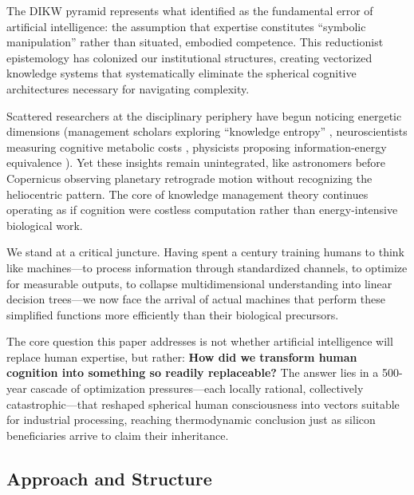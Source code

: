 The DIKW pyramid represents what \citet{dreyfus1979} identified as the fundamental error of artificial intelligence: the assumption that expertise constitutes ``symbolic manipulation'' rather than situated, embodied competence. This reductionist epistemology has colonized our institutional structures, creating vectorized knowledge systems that systematically eliminate the spherical cognitive architectures necessary for navigating complexity.

Scattered researchers at the disciplinary periphery have begun noticing energetic dimensions (management scholars exploring ``knowledge entropy'' \citep{bratianu2020}, neuroscientists measuring cognitive metabolic costs \citep{wiehler2022}, physicists proposing information-energy equivalence \citep{stonier1996}). Yet these insights remain unintegrated, like astronomers before Copernicus observing planetary retrograde motion without recognizing the heliocentric pattern. The core of knowledge management theory continues operating as if cognition were costless computation rather than energy-intensive biological work.

We stand at a critical juncture. Having spent a century training humans to think like machines---to process information through standardized channels, to optimize for measurable outputs, to collapse multidimensional understanding into linear decision trees---we now face the arrival of actual machines that perform these simplified functions more efficiently than their biological precursors.

The core question this paper addresses is not whether artificial intelligence will replace human expertise, but rather: \textbf{How did we transform human cognition into something so readily replaceable?} The answer lies in a 500-year cascade of optimization pressures---each locally rational, collectively catastrophic---that reshaped spherical human consciousness into vectors suitable for industrial processing, reaching thermodynamic conclusion just as silicon beneficiaries arrive to claim their inheritance.

\subsection{Approach and Structure}

